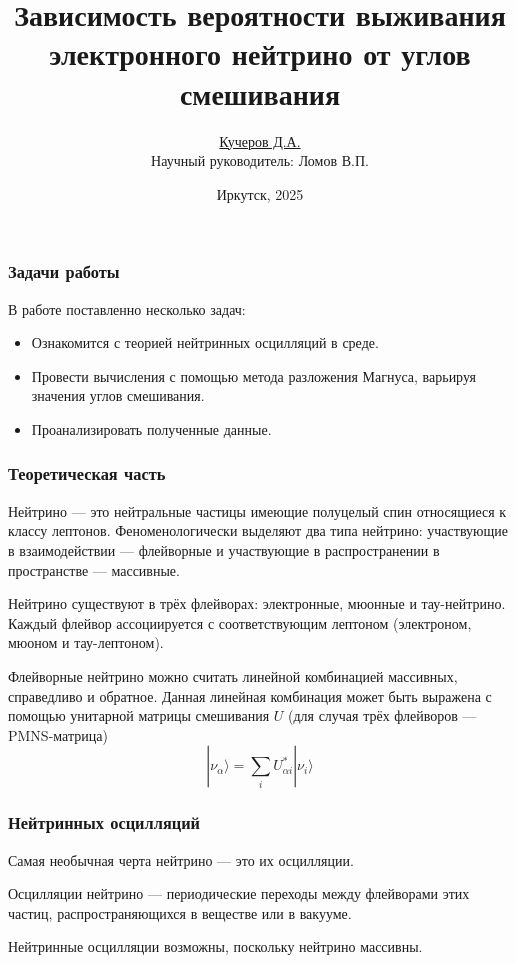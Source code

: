\documentclass[utf8,9pt,mathserif,usepdftitle=false]{beamer}
\title{Зависимость вероятности выживания электронного нейтрино от углов
  смешивания}%
\author{\underline{Кучеров Д.А.}\\[7em]\raggedleft\footnotesize Научный руководитель:
  Ломов В.П.\\%
}%
\date[ИГУ, 2025]{\vfill%
  \small{}Иркутск, 2025}
\begin{document}
\begin{frame}
  \titlepage
\end{frame}

\begin{frame}
	\frametitle{Задачи работы}
  В работе поставленно несколько задач:
  \begin{itemize}
  \item<2-> Ознакомится с теорией нейтринных осцилляций в среде.
  \item<3-> Провести вычисления с помощью метода разложения Магнуса, варьируя
    значения углов смешивания.
  \item<4-> Проанализировать полученные данные.
  \end{itemize}
\end{frame}

\begin{frame}
	\frametitle{Теоретическая часть}%
  Нейтрино — это нейтральные частицы имеющие полуцелый спин относящиеся к классу
  лептонов. Феноменологически выделяют два типа нейтрино: участвующие в
  взаимодействии — флейворные и участвующие в распространении в пространстве —
  массивные.

	Нейтрино существуют в трёх флейворах: электронные, мюонные и
  тау-нейтрино. Каждый флейвор ассоциируется с соответствующим лептоном
  (электроном, мюоном и тау-лептоном).

  Флейворные нейтрино можно считать линейной комбинацией массивных, справедливо и 
  обратное. Данная линейная комбинация может быть выражена с помощью унитарной
  матрицы смешивания \(U\) (для случая трёх флейворов --- PMNS-матрица)
  \begin{equation}
  	|\nu_{\alpha}\rangle=\sum_{i}U_{\alpha i}^{*}|\nu_{i}\rangle
  \end{equation}

\end{frame}

\begin{frame}
	\frametitle{Нейтринных осцилляций}%
	Самая необычная черта нейтрино — это их осцилляции.

  Осцилляции нейтрино — периодические переходы между флейворами этих частиц,
  распространяющихся в веществе или в вакууме.

  Нейтринные осцилляции возможны, поскольку нейтрино массивны.%
\end{frame}
\end{document}
